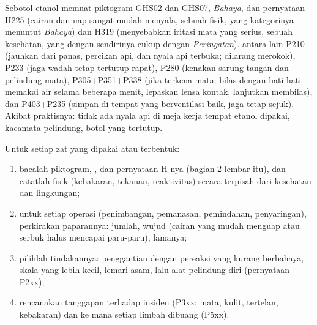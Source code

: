 \begin{example}
Sebotol etanol memuat piktogram GHS02 dan GHS07, 
\emph{Bahaya}, dan pernyataan H225 (cairan dan uap sangat mudah menyala,
sebuah  fisik, yang kategorinya menuntut \emph{Bahaya}) dan H319
(menyebabkan iritasi mata yang serius, sebuah  kesehatan, yang
dengan sendirinya cukup dengan \emph{Peringatan}).  antara lain P210 (jauhkan dari panas, percikan api, dan
nyala api terbuka; dilarang merokok), P233 (jaga wadah tetap tertutup
rapat), P280 (kenakan sarung tangan dan pelindung mata), P305+P351+P338
(jika terkena mata: bilas dengan hati-hati memakai air selama beberapa
menit, lepaskan lensa kontak, lanjutkan membilas), dan P403+P235 (simpan
di tempat yang berventilasi baik, jaga tetap sejuk). Akibat praktisnya:
tidak ada nyala api di meja kerja tempat etanol dipakai, kacamata
pelindung, botol yang tertutup.
\end{example}

\begin{method}\label{met:b1:lab-techniques-1:read-sds}
Untuk setiap zat yang dipakai atau terbentuk:
\begin{enumerate}
  \item bacalah piktogram, , dan pernyataan H-nya (bagian 2
        lembar itu), dan catatlah  fisik (kebakaran, tekanan,
        reaktivitas) secara terpisah dari  kesehatan dan
        lingkungan;
  \item untuk setiap operasi (penimbangan, pemanasan, pemindahan,
        penyaringan), perkirakan paparannya: jumlah, wujud (cairan yang
        mudah menguap atau serbuk halus mencapai paru-paru), lamanya;
  \item pilihlah tindakannya: penggantian dengan pereaksi yang kurang
        berbahaya, skala yang lebih kecil, lemari asam, lalu alat
        pelindung diri (pernyataan P2xx);
  \item rencanakan tanggapan terhadap insiden (P3xx: mata, kulit,
        tertelan, kebakaran) dan ke mana setiap limbah dibuang (P5xx).
\end{enumerate}
\end{method}

